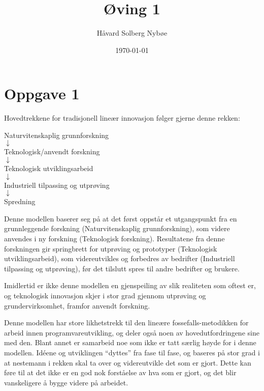\documentclass[a4paper, 12pt]{article}  %
\title{Øving 1}                         %
\author{Håvard Solberg Nybøe}           %
\date{\today}                           %
\begin{document}
\maketitle

\section*{Oppgave 1}


Hovedtrekkene for tradisjonell lineær innovasjon følger gjerne denne rekken:
\parencite{sorensen2006}


\begin{center}
    Naturvitenskaplig grunnforskning
    \\$\downarrow$ 
    \\Teknologisk/anvendt forskning
    \\$\downarrow$
    \\Teknologisk utviklingsarbeid
    \\$\downarrow$
    \\Industriell tilpassing og utprøving
    \\$\downarrow$
    \\Spredning
\end{center}

Denne modellen baserer seg på at det først oppstår et utgangspunkt fra en grunnleggende forskning (Naturvitenskaplig grunnforskning), som videre anvendes i ny forskning (Teknologisk forskning). Resultatene fra denne forskningen gir springbrett for utprøving og prototyper (Teknologisk utviklingsarbeid), som videreutvikles og forbedres av bedrifter (Industriell tilpassing og utprøving), før det tilslutt spres til andre bedrifter og brukere.

Imidlertid er ikke denne modellen en gjenspeiling av slik realiteten som oftest er, og teknologisk innovasjon skjer i stor grad gjennom utprøving og grundervirksomhet, framfor anvendt forskning. \parencite{sorensen2006} 

Denne modellen har store likhetstrekk til den lineære fossefalls-metodikken for arbeid innen programvareutvikling, og deler også noen av hovedutfordringene sine med den. Blant annet er samarbeid noe som ikke er tatt særlig høyde for i denne modellen. Idéene og utviklingen ``dyttes'' fra fase til fase, og baseres på stor grad i at nestemann i rekken skal ta over og videreutvikle det som er gjort. Dette kan føre til at det ikke er en god nok forståelse av hva som er gjort, og det blir vanskeligere å bygge videre på arbeidet.
\end{document}
